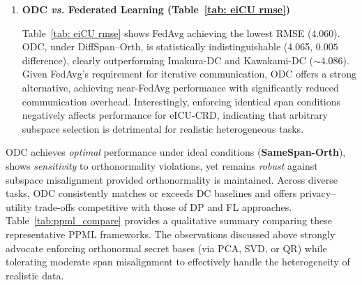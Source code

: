\documentclass[final,3p,times]{elsarticle}
\theoremstyle{plain}
\begin{document}
\begin{enumerate}[label=\textbf{\Roman*.}, leftmargin=*]
Table~\ref{tab: CelebA accuracy} shows that under realistic conditions (DiffSpan--Orth), ODC attains \SI{83.6}{\%} accuracy, surpassing DP at lower privacy budgets by substantial margins (\(+14.5\) pp for \(\varepsilon=0.5\) and \(+4.1\) pp for \(\varepsilon=2\)), while nearly matching DP at \(\varepsilon=8\) (only \(0.2\) pp below). Figure~\ref{fig:CelebA_privacy} further demonstrates that DP at high privacy budgets preserves visually identifiable features, whereas ODC fully obfuscates visual identity. Thus, ODC provides superior privacy--utility trade-offs without explicitly calibrating privacy budgets. 

However, the formal privacy mechanisms underpinning ODC and contemporary DC currently rely on a semi-honest assumption; as a result, these mechanisms remain underdeveloped for scenarios involving stronger or malicious adversaries. Suppose the semi-honest privacy assumption cannot be guaranteed or tolerated. In that case, DP-based additive perturbation may still be preferred, despite the advantageous privacy-performance trade-offs offered by DC methods. This preference arises from the rigorous privacy guarantees inherent in DP.

\item \textbf{ODC \emph{vs.} Federated Learning (Table~\ref{tab: eiCU rmse})}

Table~\ref{tab: eiCU rmse} shows FedAvg achieving the lowest RMSE (\SI{4.060}{}). ODC, under DiffSpan--Orth, is statistically indistinguishable (\SI{4.065}{}, \(0.005\) difference), clearly outperforming Imakura-DC and Kawakami-DC (\(\sim\)\SI{4.086}{}). Given FedAvg’s requirement for iterative communication, ODC offers a strong alternative, achieving near-FedAvg performance with significantly reduced communication overhead. Interestingly, enforcing identical span conditions negatively affects performance for eICU-CRD, indicating that arbitrary subspace selection is detrimental for realistic heterogeneous tasks.

\end{enumerate}

ODC achieves \emph{optimal} performance under ideal conditions (\textbf{SameSpan-Orth}), shows \emph{sensitivity} to orthonormality violations, yet remains \emph{robust} against subspace misalignment provided orthonormality is maintained. Across diverse tasks, ODC consistently matches or exceeds DC baselines and offers privacy–utility trade-offs competitive with those of DP and FL approaches. Table~\ref{tab:ppml_compare} provides a qualitative summary comparing these representative PPML frameworks. The observations discussed above strongly advocate enforcing orthonormal secret bases (via PCA, SVD, or QR) while tolerating moderate span misalignment to effectively handle the heterogeneity of realistic data.
\end{document}
